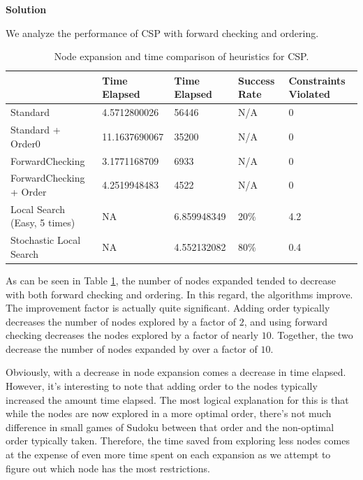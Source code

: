 \documentclass[11pt]{article}
\newcounter{AnswerCounter}
\newcounter{SubAnswerCounter}
\newenvironment{answer}[0]{
  \setcounter{SubAnswerCounter}{1}
  \bigskip
  \textbf{Solution \arabic{AnswerCounter}}
  \\
  \begin{small}
}{
  \end{small}
  \stepcounter{AnswerCounter}
}
\begin{document}
\begin{answer}[Problem 5]
We analyze the performance of CSP with forward checking and ordering.
\begin{table}[!h]
\centering
\caption{Node expansion and time comparison of heuristics for CSP.}
\label{tab:CSP_analysis}
\begin{tabular}{|l|l|l|l|l|}
\hline
                             & Time Elapsed  & Time Elapsed & Success Rate & Constraints Violated \\ \hline
Standard                     & 4.5712800026  & 56446        & N/A          & 0                    \\ \hline
Standard + Order0            & 11.1637690067 & 35200        & N/A          & 0                    \\ \hline
ForwardChecking              & 3.1771168709  & 6933         & N/A          & 0                    \\ \hline
ForwardChecking + Order      & 4.2519948483  & 4522         & N/A          & 0                    \\ \hline
Local Search (Easy, 5 times) & NA            & 6.859948349  & 20\%         & 4.2                  \\ \hline
Stochastic Local Search      & NA            & 4.552132082  & 80\%         & 0.4                  \\ \hline
\end{tabular}
\end{table}

As can be seen in Table \ref{tab:CSP_analysis}, the number of nodes expanded tended to decrease with both forward checking and ordering. In this regard, the algorithms improve. The improvement factor is actually quite significant. Adding order typically decreases the number of nodes explored by a factor of $2$, and using forward checking decreases the nodes explored by a factor of nearly $10$. Together, the two decrease the number of nodes expanded by over a factor of $10$.

Obviously, with a decrease in node expansion comes a decrease in time elapsed. However, it's interesting to note that adding order to the nodes typically increased the amount time elapsed. The most logical explanation for this is that while the nodes are now explored in a more optimal order, there's not much difference in small games of Sudoku between that order and the non-optimal order typically taken. Therefore, the time saved from exploring less nodes comes at the expense of even more time spent on each expansion as we attempt to figure out which node has the most restrictions.


\end{answer}
\end{document}
